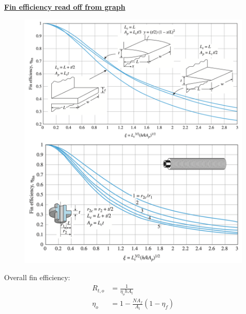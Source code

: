 \textbf{\underline{Fin efficiency read off from graph}}
\begin{figure}[H]
    \centering
    \includegraphics[width=1.0\linewidth]{images/Fin_efficiency_chart.png}
\end{figure}
Overall fin efficiency:
\begin{align*}
    R_{t,o} &= \frac{1}{\eta_o h A_t} \\
    \eta_o &= 1- \frac{N A_f}{A_t} (1-\eta_f)
\end{align*}

